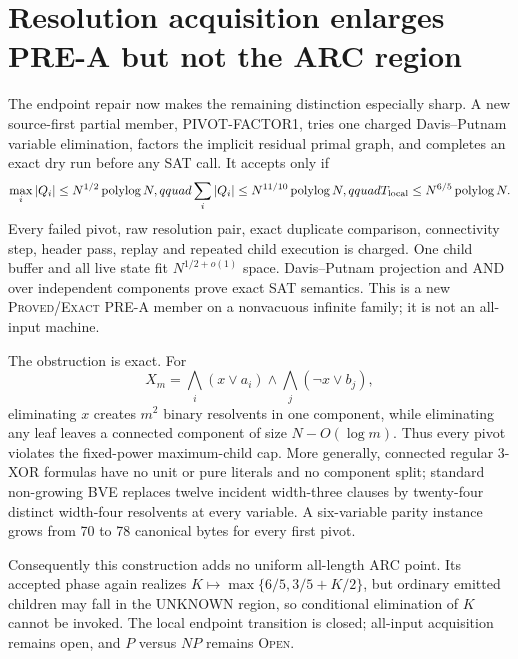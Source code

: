 \section{Resolution acquisition enlarges PRE-A but not the ARC region}

The endpoint repair now makes the remaining distinction especially sharp.
A new source-first partial member, \textsc{PIVOT-FACTOR1}, tries one charged
Davis--Putnam variable elimination, factors the implicit residual primal
graph, and completes an exact dry run before any SAT call.  It accepts only if
\[
 \max_i|Q_i|\le N^{1/2}\operatorname{polylog}N,qquad
 \sum_i|Q_i|\le N^{11/10}\operatorname{polylog}N,qquad
 T_{\rm local}\le N^{6/5}\operatorname{polylog}N.
\]
Every failed pivot, raw resolution pair, exact duplicate comparison,
connectivity step, header pass, replay and repeated child execution is
charged.  One child buffer and all live state fit
$N^{1/2+o(1)}$ space.  Davis--Putnam projection and AND over independent
components prove exact SAT semantics.  This is a new \textsc{Proved/Exact}
PRE-A member on a nonvacuous infinite family; it is not an all-input machine.

The obstruction is exact.  For
\[
 X_m=\bigwedge_i(x\vee a_i)\wedge\bigwedge_j(\neg x\vee b_j),
\]
eliminating $x$ creates $m^2$ binary resolvents in one component, while
eliminating any leaf leaves a connected component of size $N-O(\log m)$.
Thus every pivot violates the fixed-power maximum-child cap.  More generally,
connected regular 3-XOR formulas have no unit or pure literals and no
component split; standard non-growing BVE replaces twelve incident
width-three clauses by twenty-four distinct width-four resolvents at every
variable.  A six-variable parity instance grows from 70 to 78 canonical
bytes for every first pivot.

Consequently this construction adds no uniform all-length ARC point.  Its
accepted phase again realizes
$K\mapsto\max\{6/5,3/5+K/2\}$, but ordinary emitted children may fall in the
UNKNOWN region, so conditional elimination of $K$ cannot be invoked.
The local endpoint transition is closed; all-input acquisition remains open,
and $P$ versus $NP$ remains \textsc{Open}.

